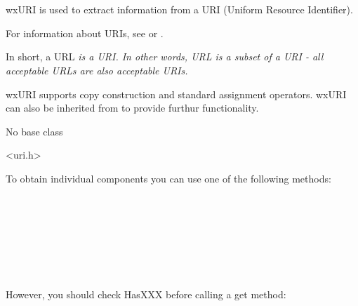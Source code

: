 
\section{}\label{wxuri}

wxURI is used to extract information from
a URI (Uniform Resource Identifier).

For information about URIs, see 
 or 
.

In short, a URL \em{is} a URI.  In other
words, URL is a subset of a URI - all 
acceptable URLs are also acceptable URIs.

wxURI supports copy construction and standard assignment
operators.  wxURI can also be inherited from to provide
furthur functionality.


No base class


<uri.h>



To obtain individual components you can use 
one of the following methods:

\\
\\
\\
\\
\\
\\

However, you should check HasXXX before
calling a get method:\\
 
\\
\\
\\
\\
\\
\\

